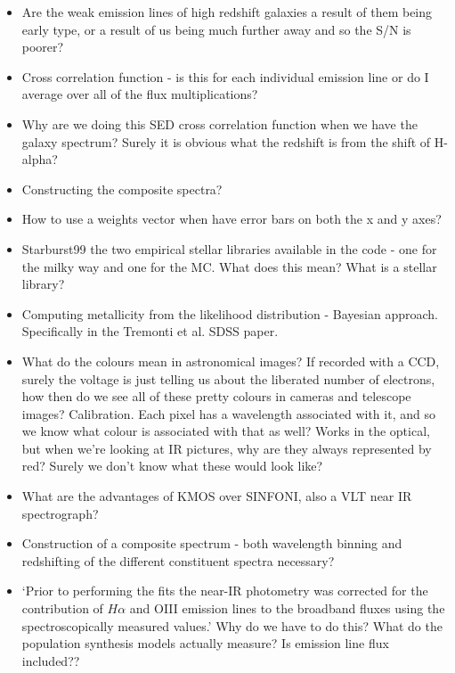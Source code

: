 \documentclass{literature}
\begin{document}
\begin{itemize}
	\item Are the weak emission lines of high redshift galaxies a result of them being early type, or a result of us being much further away and so the S/N is poorer? 
	\item Cross correlation function - is this for each individual emission line or do I average over all of the flux multiplications?
	\item Why are we doing this SED cross correlation function when we have the galaxy spectrum? Surely it is obvious what the redshift is from the shift of H-alpha?
	\item Constructing the composite spectra?
	\item How to use a weights vector when have error bars on both the x and y axes? 
	\item Starburst99 the two empirical stellar libraries available in the code - one for the milky way and one for the MC. What does this mean? What is a stellar library?
	\item Computing metallicity from the likelihood distribution - Bayesian approach. Specifically in the Tremonti et al. SDSS paper.
	\item What do the colours mean in astronomical images? If recorded with a CCD, surely the voltage is just telling us about the liberated number of electrons, how then do we see all of these pretty colours in cameras and telescope images? Calibration. Each pixel has a wavelength associated with it, and so we know what colour is associated with that as well? Works in the optical, but when we're looking at IR pictures, why are they always represented by red? Surely we don't know what these would look like? 
	\item What are the advantages of KMOS over SINFONI, also a VLT near IR spectrograph?
	\item Construction of a composite spectrum - both wavelength binning and redshifting of the different constituent spectra necessary?
	\item `Prior to performing the fits the near-IR photometry was corrected for the contribution of $H\alpha$ and OIII emission lines to the broadband fluxes using the spectroscopically measured values.' Why do we have to do this? What do the population synthesis models actually measure? Is emission line flux included?? 


\end{itemize}
\end{document}
